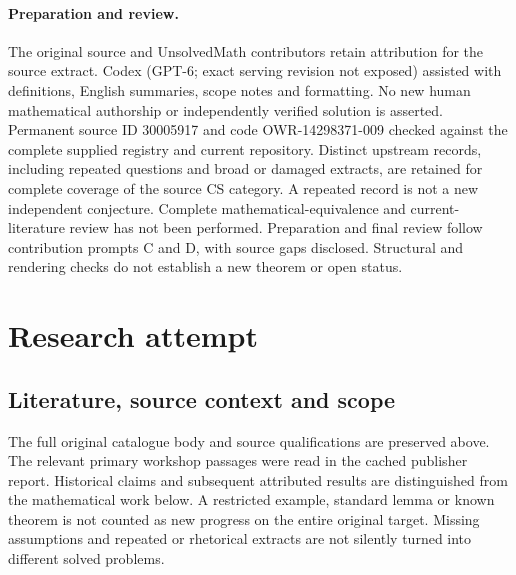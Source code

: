 \documentclass[11pt]{article}
\begin{document}
\paragraph{Preparation and review.}
The original source and UnsolvedMath contributors retain attribution for the source extract. Codex (GPT-6; exact serving revision not exposed) assisted with definitions, English summaries, scope notes and formatting. No new human mathematical authorship or independently verified solution is asserted. Permanent source ID 30005917 and code OWR-14298371-009 checked against the complete supplied registry and current repository. Distinct upstream records, including repeated questions and broad or damaged extracts, are retained for complete coverage of the source CS category. A repeated record is not a new independent conjecture. Complete mathematical-equivalence and current-literature review has not been performed. Preparation and final review follow contribution prompts C and D, with source gaps disclosed. Structural and rendering checks do not establish a new theorem or open status.
\label{end:30005917}

\section{Research attempt}
\subsection{Literature, source context and scope}
The full original catalogue body and source qualifications are preserved above. The relevant primary workshop passages were read in the cached publisher report. Historical claims and subsequent attributed results are distinguished from the mathematical work below. A restricted example, standard lemma or known theorem is not counted as new progress on the entire original target. Missing assumptions and repeated or rhetorical extracts are not silently turned into different solved problems.
\end{document}
